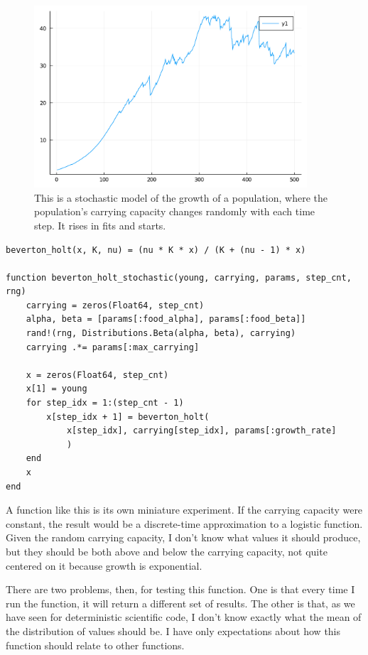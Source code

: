 \documentclass[fleqn,10pt]{olplainarticle}
\begin{document}
\begin{figure}
\centering\includegraphics[width=4in]{insects_rise.pdf}
\caption{This is a stochastic model of the growth of a
population, where the population's carrying capacity changes
randomly with each time step. It rises in fits and starts.\label{fig:insectrise}}
\end{figure}

\begin{lstlisting}
beverton_holt(x, K, nu) = (nu * K * x) / (K + (nu - 1) * x)

function beverton_holt_stochastic(young, carrying, params, step_cnt, rng)
    carrying = zeros(Float64, step_cnt)
    alpha, beta = [params[:food_alpha], params[:food_beta]]
    rand!(rng, Distributions.Beta(alpha, beta), carrying)
    carrying .*= params[:max_carrying]

    x = zeros(Float64, step_cnt)
    x[1] = young
    for step_idx = 1:(step_cnt - 1)
        x[step_idx + 1] = beverton_holt(
            x[step_idx], carrying[step_idx], params[:growth_rate]
            )
    end
    x
end
\end{lstlisting}

A function like this is its own miniature experiment. If the
carrying capacity were constant, the result would be a
discrete-time approximation to a logistic function. Given the
random carrying capacity, I don't know what values it should
produce, but they should be both above and below the carrying
capacity, not quite centered on it because growth is exponential.

There are two problems, then, for testing this function.
One is that every time I run the function, it will return a different
set of results. The other is that, as we have seen for deterministic
scientific code, I don't know exactly what the mean of the
distribution of values should be. I have only expectations about how
this function should relate to other functions.
\end{document}
